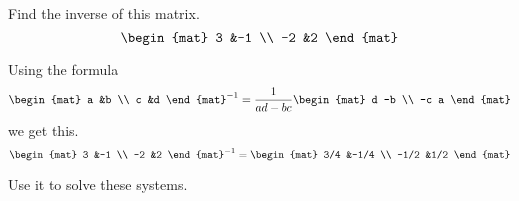 \documentclass[answers, nolegalese, 11pt]{examjh}
\begin{document}
\thispagestyle{empty}
\vspace{-1ex}
\makebox[\textwidth]{\hbox{}\hrulefill\hbox{}}


\begin{questions}
\question
Find the inverse of this matrix.
\begin{equation*}
\begin{mat}
  3  &-1  \\
 -2  &2
\end{mat}
\end{equation*}
\begin{solution}
Using the formula
\begin{equation*}
\begin{mat}
  a  &b  \\
  c  &d  
\end{mat}^{-1}
=\frac{1}{ad-bc}
\begin{mat}
  d  -b  \\
 -c  a
\end{mat}
\end{equation*}
we get this.
\begin{equation*}
\begin{mat}
  3  &-1  \\
 -2  &2
\end{mat}^{-1}
=
\begin{mat}
  3/4  &-1/4 \\
 -1/2  &1/2
\end{mat}
\end{equation*}
\end{solution}
Use it to solve these systems.
\begin{parts}

\end{parts}
\end{questions}
\end{document}

